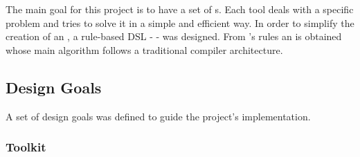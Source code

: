 The main goal for this project is to have a set of \abcpt{}s. Each tool deals with a specific
problem and tries to solve it in a simple and efficient way. In order to simplify the creation of an
\abcpt{}, a rule-based \ac{DSL} - \abcdt{} - was designed. From \abcdt{}'s rules an \abcpt{} is
obtained whose main algorithm follows a traditional compiler architecture.

\subsection*{Design Goals}

A set of design goals was defined to guide the project's implementation.

\subsubsection*{Toolkit}
% 
